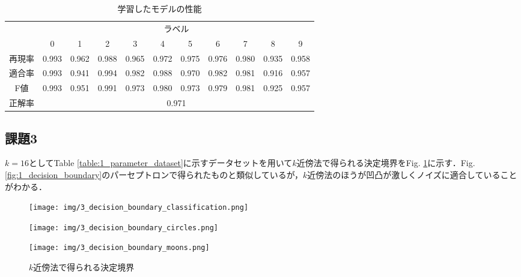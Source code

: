 \documentclass[a4paper,12pt]{jsarticle}
\renewcommand{\figurename}{Fig. }
\renewcommand{\tablename}{Table }
\begin{document}
\begin{table}[htbp]
  \centering
  \caption{学習したモデルの性能}
  \label{table:2_performance}
  \begin{tabular}{ccccccccccc}
    \toprule
        & \multicolumn{10}{c}{ラベル}                                                                           \\
        & 0                          & 1     & 2     & 3     & 4     & 5     & 6     & 7     & 8     & 9     \\
    \midrule
    再現率 & 0.993                      & 0.962 & 0.988 & 0.965 & 0.972 & 0.975 & 0.976 & 0.980 & 0.935 & 0.958 \\
    適合率 & 0.993                      & 0.941 & 0.994 & 0.982 & 0.988 & 0.970 & 0.982 & 0.981 & 0.916 & 0.957 \\
    F値  & 0.993                      & 0.951 & 0.991 & 0.973 & 0.980 & 0.973 & 0.979 & 0.981 & 0.925 & 0.957 \\
    正解率 & \multicolumn{10}{c}{0.971}                                                                         \\
    \bottomrule
  \end{tabular}
\end{table}

\subsection*{課題3}
$k = 16$として\tablename\ref{table:1_parameter_dataset}に示すデータセットを用いて$k$近傍法で得られる決定境界を\figurename\ref{fig:3_decision_boundary}に示す．\figurename\ref{fig:1_decision_boundary}のパーセプトロンで得られたものと類似しているが，$k$近傍法のほうが凹凸が激しくノイズに適合していることがわかる．

\begin{figure}[htbp]
  \centering
  \begin{minipage}[b]{0.25\linewidth}
    \centering
    \texttt{[image: img/3\_decision\_boundary\_classification.png]}
    \label{fig:3_decision_boundary_classification}
  \end{minipage}
  \begin{minipage}[b]{0.25\linewidth}
    \centering
    \texttt{[image: img/3\_decision\_boundary\_circles.png]}
    \label{fig:3_decision_boundary_circles}
  \end{minipage}
  \begin{minipage}[b]{0.25\linewidth}
    \centering
    \texttt{[image: img/3\_decision\_boundary\_moons.png]}
    \label{fig:3_decision_boundary_moons}
  \end{minipage}
  \caption{$k$近傍法で得られる決定境界}
  \label{fig:3_decision_boundary}
\end{figure}
\end{document}
